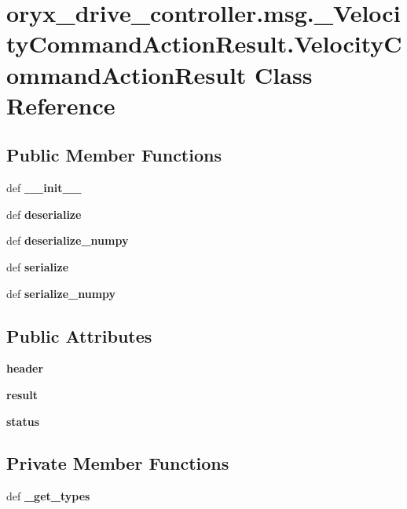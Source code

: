 \section{oryx\-\_\-drive\-\_\-controller.\-msg.\-\_\-\-Velocity\-Command\-Action\-Result.\-Velocity\-Command\-Action\-Result \-Class \-Reference}
\label{classoryx__drive__controller_1_1msg_1_1__VelocityCommandActionResult_1_1VelocityCommandActionResult}
\subsection*{\-Public \-Member \-Functions}
\begin{DoxyCompactItemize}
\item 
def {\bf \-\_\-\-\_\-init\-\_\-\-\_\-}
\item 
def {\bf deserialize}
\item 
def {\bf deserialize\-\_\-numpy}
\item 
def {\bf serialize}
\item 
def {\bf serialize\-\_\-numpy}
\end{DoxyCompactItemize}
\subsection*{\-Public \-Attributes}
\begin{DoxyCompactItemize}
\item 
{\bf header}
\item 
{\bf result}
\item 
{\bf status}
\end{DoxyCompactItemize}
\subsection*{\-Private \-Member \-Functions}
\begin{DoxyCompactItemize}
\item 
def {\bf \-\_\-get\-\_\-types}
\end{DoxyCompactItemize}
